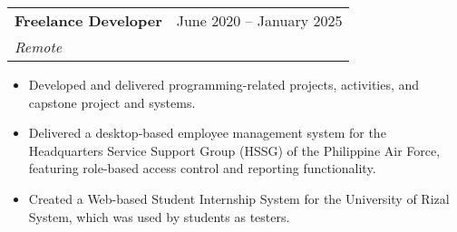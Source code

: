 \documentclass[legal,10pt]{article}
\makeatletter
\newcommand{\resumeItem}[1]{
  \item\small{
    {#1 \vspace{-2pt}}
  }
}
\newcommand{\resumeSubheading}[4]{
  \vspace{-2pt}\item
    \begin{tabular*}{0.97\textwidth}[t]{l@{\extracolsep{\fill}}r}
      \textbf{#1} & #2 \\
      \textit{\small#3} & \textit{\small #4} \\
    \end{tabular*}\vspace{-7pt}
}
\newcommand{\resumeSubSubheading}[2]{
    \item
    \begin{tabular*}{0.97\textwidth}{l@{\extracolsep{\fill}}r}
      \textit{\small#1} & \textit{\small #2} \\
    \end{tabular*}\vspace{-7pt}
}
\newcommand{\resumeSubHeadingListEnd}{\end{itemize}}
\newcommand{\resumeItemListStart}{\begin{itemize}}
\newcommand{\resumeItemListEnd}{\end{itemize}\vspace{-5pt}}
\makeatother
\begin{document}
    \resumeSubheading
      {Freelance Developer}{June 2020 -- January 2025}
      {Remote}{}
      \resumeItemListStart
        \resumeItem{Developed and delivered programming-related projects, activities, and capstone project and systems.}
        \resumeItem{Delivered a desktop-based employee management system for the Headquarters Service Support Group (HSSG) of the Philippine Air Force, featuring role-based access control and reporting functionality.}
        \resumeItem{Created a Web-based Student Internship System for the University of Rizal System, which was used by students as testers.}
      \resumeItemListEnd




    

    
\end{document}
